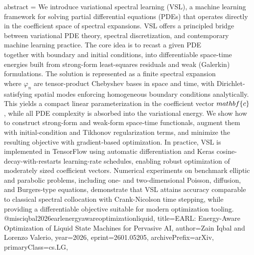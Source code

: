{      abstract = {We introduce variational spectral learning (VSL), a machine learning framework for solving partial differential equations (PDEs) that operates directly in the coefficient space of spectral expansions. VSL offers a principled bridge between variational PDE theory, spectral discretization, and contemporary machine learning practice. The core idea is to recast a given PDE \\[ \\mathcal\{L\}u = f \\quad \\text\{in\} \\quad Q=Ω\\times(0,T), \\] together with boundary and initial conditions, into differentiable space-time energies built from strong-form least-squares residuals and weak (Galerkin) formulations. The solution is represented as a finite spectral expansion \\[ u_N(x,t)=\\sum_\{n=1\}^\{N\} c_n\\,φ_n(x,t), \\] where $φ_n$ are tensor-product Chebyshev bases in space and time, with Dirichlet-satisfying spatial modes enforcing homogeneous boundary conditions analytically. This yields a compact linear parameterization in the coefficient vector $\\mathbf\{c\}$, while all PDE complexity is absorbed into the variational energy. We show how to construct strong-form and weak-form space-time functionals, augment them with initial-condition and Tikhonov regularization terms, and minimize the resulting objective with gradient-based optimization. In practice, VSL is implemented in TensorFlow using automatic differentiation and Keras cosine-decay-with-restarts learning-rate schedules, enabling robust optimization of moderately sized coefficient vectors. Numerical experiments on benchmark elliptic and parabolic problems, including one- and two-dimensional Poisson, diffusion, and Burgers-type equations, demonstrate that VSL attains accuracy comparable to classical spectral collocation with Crank-Nicolson time stepping, while providing a differentiable objective suitable for modern optimization tooling.}
}@misc{iqbal2026earlenergyawareoptimizationliquid,
      title={EARL: Energy-Aware Optimization of Liquid State Machines for Pervasive AI}, 
      author={Zain Iqbal and Lorenzo Valerio},
      year={2026},
      eprint={2601.05205},
      archivePrefix={arXiv},
      primaryClass={cs.LG},
}
